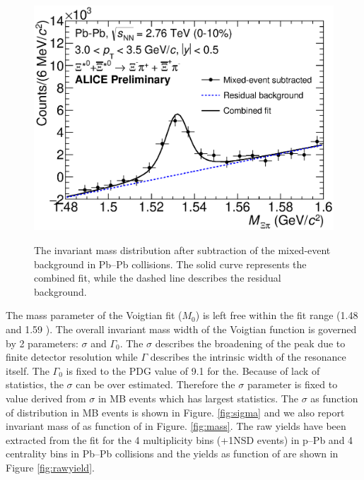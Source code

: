 \begin{figure}[htbp]
\begin{center}
\includegraphics[width=12.0cm]{./Version1/FigChapter5/Extraction/SigPbPb_After.eps}
\hspace{0.5cm}
\label{fig:sigpPba} 
\caption{ The invariant mass distribution after subtraction of the mixed-event background in Pb--Pb collisions. 
The solid curve represents the combined fit, while the dashed line describes the residual background.}
\end{center}
\end{figure}

The mass parameter of the Voigtian fit ($M_{0}$) is left free within the fit range (1.48 \Gmass and 1.59 \Gmass). The overall invariant mass width of the Voigtian function is governed by 2 parameters: $\sigma$ and $\Gamma_{0}$. The $\sigma$ describes the broadening of the peak due to finite detector resolution while $\Gamma$ describes the intrinsic width of the resonance itself. The $\Gamma_{0}$ is fixed to the PDG value of 9.1 \mmom for the\xis. Because of lack of statistics, the $\sigma$ can be over estimated. Therefore the $\sigma$ parameter is fixed to value derived from $\sigma$ in MB events which has largest statistics. The $\sigma$ as function of \pt distribution in MB events is shown in Figure. \ref{fig:sigma} and we also report invariant mass of \xis as function of \pt in Figure. \ref{fig:mass}. The \xis raw yields have been extracted from the fit for the 4 multiplicity bins (+1NSD events) in p--Pb and 4 centrality bins in Pb--Pb collisions and the yields as function of \pt are shown in Figure \ref{fig:rawyield}.



